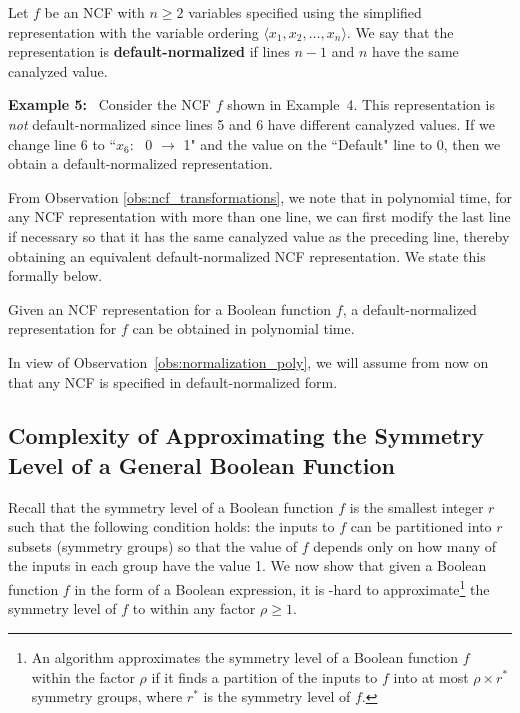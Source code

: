 \begin{definition}
\label{def:normalized}
Let $f$ be an NCF with $n \geq 2$ variables specified using
the simplified representation with 
the variable ordering $\langle x_1, x_2, \ldots, x_n\rangle$.
We say that the representation is {\bf default-normalized} if
lines $n-1$ and $n$ have the same canalyzed value.
\end{definition}

\noindent
\textbf{Example 5:}~ 
Consider the NCF $f$ shown in Example~4. 
This representation is \emph{not} default-normalized since lines 5 and 6
have different canalyzed values.
If we change line 6 to ``$x_6$:~ 0 $\longrightarrow$ 1" and the
value on the ``Default" line to 0, then we obtain 
a default-normalized representation. 

\medskip
From Observation \ref{obs:ncf_transformations},
we note that in polynomial time, for any NCF representation with more than one line,
we can first modify the last line if necessary 
so that it has the same canalyzed value as the preceding line,
thereby obtaining an equivalent default-normalized NCF representation.
We state this formally below.

\begin{observation}\label{obs:normalization_poly}
Given an NCF representation for a Boolean function $f$, a default-normalized
representation for $f$ can be obtained in polynomial time. \QED
\end{observation}

In view of Observation~\ref{obs:normalization_poly},
we will assume from now on that any NCF is specified in default-normalized form.

\subsection{Complexity of Approximating the Symmetry Level of a 
General Boolean Function}
\label{sse:symmetry_level_hardness}

Recall that the symmetry level of a Boolean function $f$ is the smallest
integer $r$ such that the following condition holds:
the  inputs to $f$ can be partitioned into $r$ subsets 
(symmetry groups) so that the value of $f$ depends only on 
how many of the inputs in each group have the value 1.
We now show that given a Boolean function $f$
in the form of a Boolean expression, it is \cnp-hard to 
approximate\footnote{An algorithm approximates the symmetry
level of a Boolean function $f$ within the factor $\rho$ if it finds a
partition of the inputs to $f$ into at most $\rho \times r^*$ symmetry
groups, where $r^*$ is the symmetry level of $f$.}
the symmetry level of $f$ to within any factor $\rho \geq 1$.

